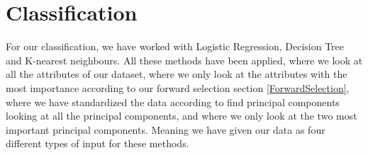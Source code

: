 \section{Classification}
\label{classification}
For our classification, we have worked with Logistic Regression, Decision Tree and K-nearest neighbours. All these methods have been applied, where we look at all the attributes of our dataset, where we only look at the attributes with the most importance according to our forward selection section \ref{ForwardSelection}, where we have standardized the data according to find principal components looking at all the principal components, and where we only look at the two most important principal components. Meaning we have given our data as four different types of input for these methods.







